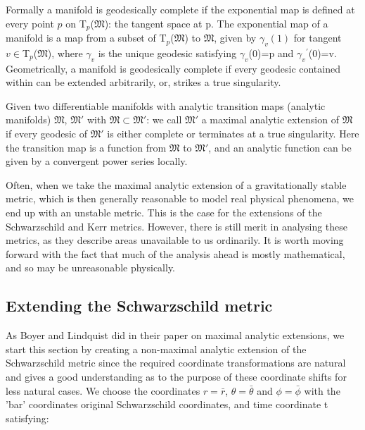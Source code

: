 \documentclass[oneside,openright,frontopenright, singlespacing]{dmathesis}
\begin{document}
\vspace{1em}
	Formally a manifold is geodesically complete if the exponential map is defined at every point $p$ on T$_p$($\mathfrak{M}$): the tangent space at p. The exponential map of a manifold is a map from a subset of T$_p$($\mathfrak{M}$) to $\mathfrak{M}$, given by $\gamma_v(1)$ for tangent $v\in$T$_p$($\mathfrak{M}$), where $\gamma_v$ is the unique geodesic satisfying $\gamma_v$(0)=p and ${\gamma_v}^{'}$(0)=v. Geometrically, a manifold is geodesically complete if every geodesic contained within can be extended arbitrarily, or, strikes a true singularity.

\vspace{1em}
	Given two differentiable manifolds with analytic transition maps (analytic manifolds) $\mathfrak{M}$, $\mathfrak{M}'$ with $\mathfrak{M} \subset \mathfrak{M}'$: we call $\mathfrak{M}'$ a maximal analytic extension of $\mathfrak{M}$ if every geodesic of $\mathfrak{M}'$ is either complete or terminates at a true singularity. Here the transition map is a function from $\mathfrak{M}$ to $\mathfrak{M}'$, and an analytic function can be given by a convergent power series locally.

\vspace{1em}
	Often, when we take the maximal analytic extension of a gravitationally stable metric, which is then generally reasonable to model real physical phenomena, we end up with an unstable metric. This is the case for the extensions of the Schwarzschild and Kerr metrics. However, there is still merit in analysing these metrics, as they describe areas unavailable to us ordinarily. It is worth moving forward with the fact that much of the analysis ahead is mostly mathematical, and so may be unreasonable physically.

\subsection{Extending the Schwarzschild metric}\label{subsec:Subsection6.1.1}

\vspace{1em}
	As Boyer and Lindquist did in their paper on maximal analytic extensions\cite{boyer1967maximal}, we start this section by creating a non-maximal analytic extension of the Schwarzschild metric since the required coordinate transformations are natural and gives a good understanding as to the purpose of these coordinate shifts for less natural cases. We choose the coordinates $r=\bar{r}$, $\theta=\bar{\theta}$ and $\phi=\bar{\phi}$ with the 'bar' coordinates original Schwarzschild coordinates, and time coordinate t satisfying:
\end{document}
